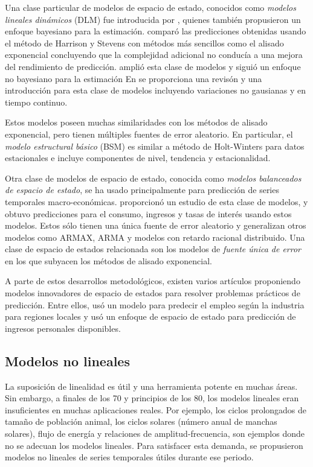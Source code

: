 \documentclass{llncs}
\begin{document}
Una clase particular de modelos de espacio de estado, conocidos como \emph{modelos lineales dinámicos} (DLM) fue introducida por \cite{Harrison1976205}, quienes también propusieron un enfoque bayesiano para la estimación. \cite{Fildes1983137} comparó las predicciones obtenidas usando el método de Harrison y Stevens con métodos más sencillos como el alisado exponencial concluyendo que la complejidad adicional no conducía a una mejora del rendimiento de predicción. \cite{Harvey1989} amplió esta clase de modelos y siguió un enfoque no bayesiano para la estimación En \cite{Harvey2006327} se proporciona una revisón y una introducción para esta clase de modelos incluyendo variaciones no gausianas y en tiempo continuo. 

Estos modelos poseen muchas similaridades con los métodos de alisado exponencial, pero tienen múltiples fuentes de error aleatorio. En particular, el \emph{modelo estructural básico} (BSM) es similar a método de Holt-Winters para datos estacionales e incluye componentes de nivel, tendencia y estacionalidad.

Otra clase de modelos de espacio de estado, conocida como \emph{modelos balanceados de espacio de estado}, se ha usado principalmente para predicción de series temporales macro-económicas. \cite{Mittnik1990337} proporcionó un estudio de esta clase de modelos, y \cite{Vinod1995217} obtuvo predicciones para el consumo, ingresos y tasas de interés usando estos modelos. Estos sólo tienen una única fuente de error aleatorio y generalizan otros modelos como ARMAX, ARMA y modelos con retardo racional distribuido. Una clase de espacio de estados relacionada son los modelos de \emph{fuente única de error} en los que subyacen los métodos de alisado exponencial.

A parte de estos desarrollos metodológicos, existen varios artículos proponiendo modelos innovadores de espacio de estados para resolver problemas prácticos de predicción. Entre ellos, \cite{Coomes1992473} usó un modelo para predecir el empleo según la industria para regiones locales y \cite{Patterson1995395} usó un enfoque de espacio de estado para predicción de ingresos personales disponibles. 

\subsection{Modelos no lineales}

La suposición de linealidad es útil y una herramienta potente en muchas áreas. Sin embargo, a finales de los 70 y principios de los 80, los modelos lineales eran insuficientes en muchas aplicaciones reales. Por ejemplo, los ciclos prolongados de tamaño de población animal, los ciclos solares (número anual de manchas solares), flujo de energía y relaciones de amplitud-frecuencia, son ejemplos donde no se adecuan los modelos lineales. Para satisfacer esta demanda, se propusieron modelos no lineales de series temporales útiles durante ese periodo.
\end{document}
